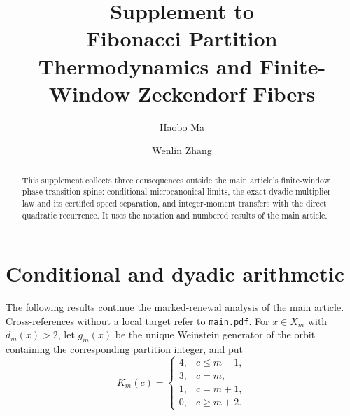\documentclass[12pt,reqno]{amsart}
\title[Supplement to Fibonacci partition thermodynamics]{Supplement to\\
Fibonacci Partition Thermodynamics and Finite-Window Zeckendorf Fibers}
\author{Haobo Ma}
\author{Wenlin Zhang}
\date{}
\theoremstyle{plain}
\theoremstyle{remark}
\theoremstyle{definition}
\numberwithin{equation}{section}
\begin{document}
\begin{abstract}
This supplement collects three consequences outside the main article's
finite-window phase-transition spine: conditional microcanonical limits,
the exact dyadic multiplier law and its certified speed separation, and
integer-moment transfers with the direct quadratic recurrence.  It uses the
notation and numbered results of the main article.
\end{abstract}
\maketitle

\section{Conditional and dyadic arithmetic}
\label{sec:supplement-arithmetic}
The following results continue the marked-renewal analysis of the main
article.  Cross-references without a local target refer to \texttt{main.pdf}.
For \(x\in X_m\) with \(d_m(x)>2\), let \(g_m(x)\) be the unique Weinstein
generator of the orbit containing the corresponding partition integer, and
put
\[
 K_m(c)=
 \begin{cases}
 4,&c\le m-1,\\
 3,&c=m,\\
 1,&c=m+1,\\
 0,&c\ge m+2.
 \end{cases}
\]





\end{document}
